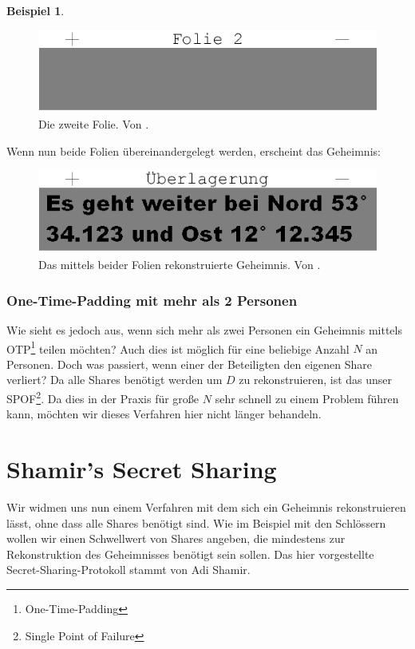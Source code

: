 \documentclass[12pt, a4paper, oneside, titlepage]{report}
\theoremstyle{definition}
\newtheorem{bsp}[lemma]{Beispiel}
\begin{document}
\begin{bsp}
		\begin{figure}[H]
			\centering
			\includegraphics[width=1.\textwidth]{images/visual3.png}
			\caption{Die zweite Folie. Von \cite{visual}.}
			\label{sheet2}
		\end{figure}
	
		Wenn nun beide Folien übereinandergelegt werden, erscheint das Geheimnis:
		
		\begin{figure}[H]
			\centering
			\includegraphics[width=1.\textwidth]{images/visual4.png}
			\caption{Das mittels beider Folien rekonstruierte Geheimnis. Von \cite{visual}.}
			\label{secret-image}
		\end{figure}
	\end{bsp}
	
	\subsubsection{One-Time-Padding mit mehr als 2 Personen}
	Wie sieht es jedoch aus, wenn sich mehr als zwei Personen ein Geheimnis mittels OTP\footnote{One-Time-Padding} teilen möchten? Auch dies ist möglich für eine beliebige Anzahl $ N $ an Personen. Doch was passiert, wenn einer der Beteiligten den eigenen Share verliert? Da alle Shares benötigt werden um $ D $ zu rekonstruieren, ist das unser SPOF\footnote{Single Point of Failure}. Da dies in der Praxis für große $ N $ sehr schnell zu einem Problem führen kann, möchten wir dieses Verfahren hier nicht länger behandeln.
	
	\section{Shamir's Secret Sharing}
	
	Wir widmen uns nun einem Verfahren mit dem sich ein Geheimnis rekonstruieren lässt, ohne dass alle Shares benötigt sind. Wie im Beispiel mit den Schlössern wollen wir einen Schwellwert von Shares angeben, die mindestens zur Rekonstruktion des Geheimnisses benötigt sein sollen. Das hier vorgestellte Secret-Sharing-Protokoll stammt von Adi Shamir. \cite{shamir}
	
\end{document}
